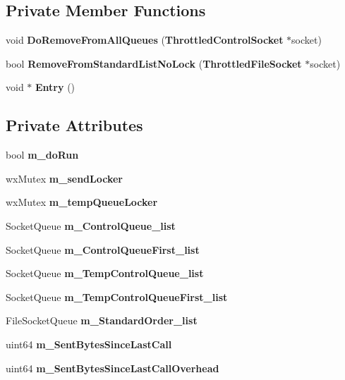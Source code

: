 \subsection*{Private Member Functions}
\begin{DoxyCompactItemize}
\item 
void {\bf DoRemoveFromAllQueues} ({\bf ThrottledControlSocket} $\ast$socket)
\item 
bool {\bf RemoveFromStandardListNoLock} ({\bf ThrottledFileSocket} $\ast$socket)
\item 
void $\ast$ {\bf Entry} ()
\end{DoxyCompactItemize}
\subsection*{Private Attributes}
\begin{DoxyCompactItemize}
\item 
bool {\bfseries m\_\-doRun}\label{classUploadBandwidthThrottler_a8ed62e79d5e2414acd010506e69f80f0}

\item 
wxMutex {\bfseries m\_\-sendLocker}\label{classUploadBandwidthThrottler_a54d2e499c2e3b3e1e6bc08ccd12494ee}

\item 
wxMutex {\bfseries m\_\-tempQueueLocker}\label{classUploadBandwidthThrottler_a8d6581d897053d13ca1b44c617726fd7}

\item 
SocketQueue {\bfseries m\_\-ControlQueue\_\-list}\label{classUploadBandwidthThrottler_a5a3815c9628e446e8ddca49c6c4092b7}

\item 
SocketQueue {\bfseries m\_\-ControlQueueFirst\_\-list}\label{classUploadBandwidthThrottler_a177839afc55d2ff6c94d932dd23073fb}

\item 
SocketQueue {\bfseries m\_\-TempControlQueue\_\-list}\label{classUploadBandwidthThrottler_ae615de3986c49d24c41aec75b80ea863}

\item 
SocketQueue {\bfseries m\_\-TempControlQueueFirst\_\-list}\label{classUploadBandwidthThrottler_a4946d2e956c1f930f6620f8bfecfa46c}

\item 
FileSocketQueue {\bfseries m\_\-StandardOrder\_\-list}\label{classUploadBandwidthThrottler_a19baf0bdd6932b5bd4b6e0db4e42fe6a}

\item 
uint64 {\bfseries m\_\-SentBytesSinceLastCall}\label{classUploadBandwidthThrottler_a86546137ffca9ffeda6b560b05dfe5e1}

\item 
uint64 {\bfseries m\_\-SentBytesSinceLastCallOverhead}\label{classUploadBandwidthThrottler_ae00cd5d3a9c4e21b6b16d5ea7bb1a384}

\end{DoxyCompactItemize}


